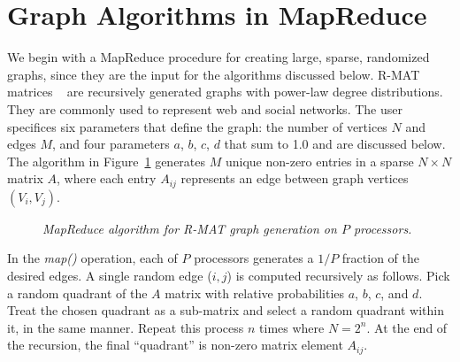\section{Graph Algorithms in MapReduce}
\label{sec:graph}

We begin with a MapReduce procedure for creating large, sparse,
randomized graphs, since they are the input for the algorithms
discussed below.  R-MAT matrices ~\cite{RMAT} are recursively
generated graphs with power-law degree distributions.  They are
commonly used to represent web and social networks.  The user
specifices six parameters that define the graph: the number of
vertices $N$ and edges $M$, and four parameters $a$, $b$, $c$, $d$
that sum to 1.0 and are discussed below.  The algorithm in
Figure~\ref{fig:rmat} generates $M$ unique non-zero entries in a
sparse $N \times N$ matrix $A$, where each entry $A_{ij}$ represents
an edge between graph vertices $(V_i,V_j)$.

\begin{figure}[htb]
 \begin{center}\end{center}

 \caption{\it MapReduce algorithm for R-MAT graph generation on $P$
 processors.}

 \label{fig:rmat}
\end{figure}

In the {\it map()} operation, each of $P$ processors generates a $1/P$
fraction of the desired edges.  A single random edge ($i,j$) is computed
recursively as follows.  Pick a random quadrant of the $A$ matrix with
relative probabilities $a$, $b$, $c$, and $d$.  Treat the chosen
quadrant as a sub-matrix and select a random quadrant within it, in
the same manner.  Repeat this process $n$ times where $N = 2^n$.  At
the end of the recursion, the final ``quadrant'' is non-zero matrix
element $A_{ij}$.

